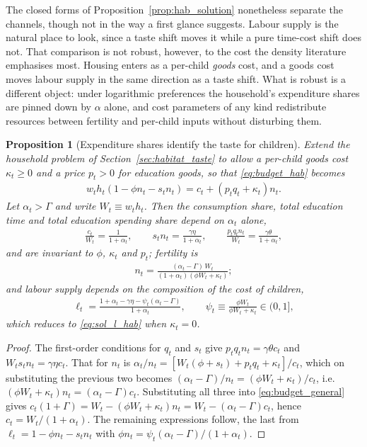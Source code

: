 \documentclass[11pt]{article}
\newtheorem{proposition}{Proposition}
\begin{document}
The closed forms of Proposition~\ref{prop:hab_solution} nonetheless separate the channels, though
not in the way a first glance suggests. Labour supply is the natural place to look, since a taste
shift moves it while a pure time-cost shift does not. That comparison is not robust, however, to
the cost the density literature emphasises most. Housing enters as a per-child \emph{goods} cost,
and a goods cost moves labour supply in the same direction as a taste shift. What is robust is a
different object: under logarithmic preferences the household's expenditure shares are pinned down
by $\alpha$ alone, and cost parameters of any kind redistribute resources between fertility and
per-child inputs without disturbing them.

\begin{proposition}[Expenditure shares identify the taste for children]
\label{prop:identification}
Extend the household problem of Section~\ref{sec:habitat_taste} to allow a per-child goods cost
$\kappa_t\ge 0$ and a price $p_t>0$ for education goods, so that \eqref{eq:budget_hab} becomes
\begin{align}
w_t h_t\left(1-\phi n_t-s_t n_t\right)=c_t+\left(p_t q_t+\kappa_t\right)n_t .
\label{eq:budget_general}
\end{align}
Let $\alpha_t>\Gamma$ and write $W_t\equiv w_t h_t$. Then the consumption share, total education
time and total education spending share depend on $\alpha_t$ alone,
\begin{align}
\frac{c_t}{W_t}=\frac{1}{1+\alpha_t},
\qquad
s_t n_t=\frac{\gamma\eta}{1+\alpha_t},
\qquad
\frac{p_t q_t n_t}{W_t}=\frac{\gamma\theta}{1+\alpha_t},
\label{eq:invariants}
\end{align}
and are invariant to $\phi$, $\kappa_t$ and $p_t$; fertility is
\begin{align}
n_t=\frac{(\alpha_t-\Gamma)\,W_t}{(1+\alpha_t)\left(\phi W_t+\kappa_t\right)} ;
\label{eq:n_general}
\end{align}
and labour supply depends on the \emph{composition} of the cost of children,
\begin{align}
\ell_t=\frac{1+\alpha_t-\gamma\eta-\psi_t\left(\alpha_t-\Gamma\right)}{1+\alpha_t},
\qquad
\psi_t\equiv\frac{\phi W_t}{\phi W_t+\kappa_t}\in(0,1],
\label{eq:ell_general}
\end{align}
which reduces to \eqref{eq:sol_l_hab} when $\kappa_t=0$.
\end{proposition}

\begin{proof}
The first-order conditions for $q_t$ and $s_t$ give $p_tq_tn_t=\gamma\theta c_t$ and
$W_ts_tn_t=\gamma\eta c_t$. That for $n_t$ is
$\alpha_t/n_t=\left[W_t(\phi+s_t)+p_tq_t+\kappa_t\right]/c_t$, which on substituting the previous
two becomes $(\alpha_t-\Gamma)/n_t=(\phi W_t+\kappa_t)/c_t$, i.e.
$(\phi W_t+\kappa_t)n_t=(\alpha_t-\Gamma)c_t$. Substituting all three into
\eqref{eq:budget_general} gives
$c_t(1+\Gamma)=W_t-(\phi W_t+\kappa_t)n_t=W_t-(\alpha_t-\Gamma)c_t$, hence
$c_t=W_t/(1+\alpha_t)$. The remaining expressions follow, the last from
$\ell_t=1-\phi n_t-s_tn_t$ with $\phi n_t=\psi_t(\alpha_t-\Gamma)/(1+\alpha_t)$.
\end{proof}
\end{document}
